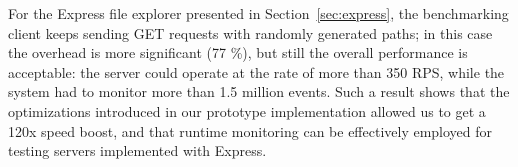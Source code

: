 For the Express file explorer presented in Section~\ref{sec:express}, the benchmarking client keeps sending GET requests
with randomly generated paths; in this case the overhead is more significant (77 \%), but still the overall performance 
is acceptable: the server could operate at the rate of more than 350 RPS, while the system had to monitor more than 1.5 million events.
Such a result shows that the optimizations introduced in our prototype implementation allowed us
to get a 120x speed boost, and that runtime monitoring can be effectively employed for testing servers implemented with Express.

